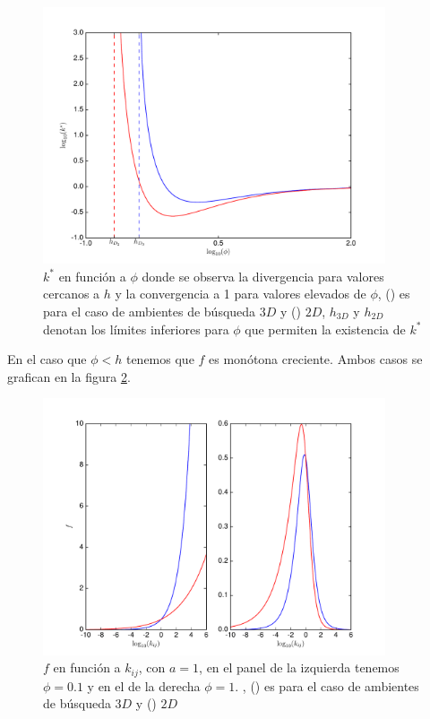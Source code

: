 \begin{figure}
\begin{center}
 \includegraphics[width=0.9\textwidth]{./Plots/kmaxGrazing.pdf}
 \caption[$k^*, Grazing$]{$k^*$ en funci\'on a $\phi$ donde se observa la divergencia para valores cercanos a $h$ y la convergencia a 1 para valores elevados de $\phi$, ({\hwplotB}) es para el caso de ambientes de b\'usqueda $3D$ y ({\hwplotR}) $2D$, $h_{3D}$ y $h_{2D}$ denotan los l\'imites inferiores para $\phi$ que permiten la existencia de $k^*$}
 \label{fig:kmaxGrazing} 
\end{center}
\end{figure}



En el caso que $\phi < h$ tenemos que $f$ es mon\'otona creciente. Ambos casos se grafican en la figura \ref{fig:f1Grazing}.

\begin{figure}
\begin{center}
 \includegraphics[width=0.9\textwidth]{./Plots/f1Grazing.pdf}
 \caption[$f_1, Grazing$]{$f$ en funci\'on a $k_{ij}$, con $a =1$, en el panel de la izquierda tenemos $\phi = 0.1$ y en el de la derecha $\phi=1.$ , ({\hwplotB}) es para el caso de ambientes de b\'usqueda $3D$ y ({\hwplotR}) $2D$}
 \label{fig:f1Grazing} 
\end{center}
\end{figure}

